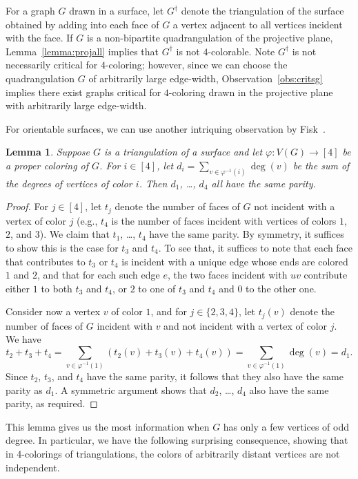 \documentclass[12pt,twoside,openright,a4paper]{book}
\newtheorem{lemma}[theorem]{Lemma}
\begin{document}
For a graph $G$ drawn in a surface, let $G^\dagger$ denote the triangulation of the surface obtained by adding
into each face of $G$ a vertex adjacent to all vertices incident with the face.  If $G$ is a non-bipartite quadrangulation
of the projective plane, Lemma~\ref{lemma:projall} implies that $G^\dagger$ is not $4$-colorable.  Note $G^\dagger$ is not
necessarily critical for $4$-coloring; however, since we can choose the quadrangulation $G$ of arbitrarily large edge-width,
Observation~\ref{obs:critsg} implies there exist graphs critical for $4$-coloring drawn in the projective plane with arbitrarily
large edge-width.

For orientable surfaces, we can use another intriquing observation by Fisk~\cite{Fisk78}.

\begin{lemma}\label{lemma:oddsame}
Suppose $G$ is a triangulation of a surface and let $\varphi:V(G)\to[4]$ be a proper coloring of $G$.
For $i\in[4]$, let $d_i=\sum_{v\in \varphi^{-1}(i)} \deg(v)$ be the sum of the degrees of vertices of color $i$.  Then $d_1$, \ldots, $d_4$ all have the same parity.
\end{lemma}
\begin{proof}
For $j\in[4]$, let $t_j$ denote the number of faces of $G$ not incident with a vertex of color $j$ (e.g., $t_4$
is the number of faces incident with vertices of colors $1$, $2$, and $3$).
We claim that $t_1$, \ldots, $t_4$ have the same parity.  By symmetry, it suffices to show this is the case for $t_3$ and $t_4$.
To see that, it suffices to note that each face that contributes to $t_3$ or $t_4$ is incident with a unique edge
whose ends are colored $1$ and $2$, and that for each such edge $e$, the two faces incident with $uv$ contribute either
$1$ to both $t_3$ and $t_4$, or $2$ to one of $t_3$ and $t_4$ and $0$ to the other one.

Consider now a vertex $v$ of color $1$, and for $j\in \{2,3,4\}$, let $t_j(v)$ denote the number of faces of
$G$ incident with $v$ and not incident with a vertex of color $j$.  We have
$$t_2+t_3+t_4=\sum_{v\in \varphi^{-1}(1)} (t_2(v)+t_3(v)+t_4(v))=\sum_{v\in \varphi^{-1}(1)} \deg(v)=d_1.$$
Since $t_2$, $t_3$, and $t_4$ have the same parity, it follows that they also have the same parity as $d_1$.
A symmetric argument shows that $d_2$, \ldots, $d_4$ also have the same parity, as required.
\end{proof}
This lemma gives us the most information when $G$ has only a few vertices of odd degree.
In particular, we have the following surprising consequence, showing that in 4-colorings of triangulations,
the colors of arbitrarily distant vertices are not independent.
\end{document}
